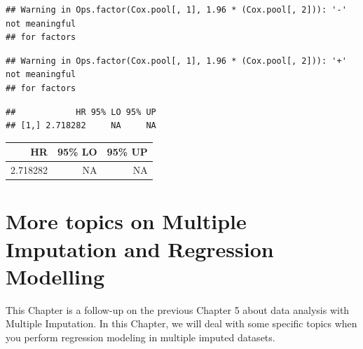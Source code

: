 \documentclass[
]{book}
\newenvironment{Shaded}{\begin{snugshade}}{\end{snugshade}}
\newcommand{\DataTypeTok}[1]{\textcolor[rgb]{0.13,0.29,0.53}{#1}}
\newcommand{\KeywordTok}[1]{\textcolor[rgb]{0.13,0.29,0.53}{\textbf{#1}}}
\newcommand{\NormalTok}[1]{#1}
\newcommand{\OperatorTok}[1]{\textcolor[rgb]{0.81,0.36,0.00}{\textbf{#1}}}
\newcommand{\StringTok}[1]{\textcolor[rgb]{0.31,0.60,0.02}{#1}}
\begin{document}
\begin{verbatim}
## Warning in Ops.factor(Cox.pool[, 1], 1.96 * (Cox.pool[, 2])): '-' not meaningful
## for factors
\end{verbatim}

\begin{verbatim}
## Warning in Ops.factor(Cox.pool[, 1], 1.96 * (Cox.pool[, 2])): '+' not meaningful
## for factors
\end{verbatim}

\begin{Shaded}
\end{Shaded}

\begin{verbatim}
##            HR 95% LO 95% UP
## [1,] 2.718282     NA     NA
\end{verbatim}

\begin{Shaded}
\end{Shaded}

\begin{tabular}{r|r|r}
\hline
HR & 95\% LO & 95\% UP\\
\hline
2.718282 & NA & NA\\
\hline
\end{tabular}

\hypertarget{more-topics-on-multiple-imputation-and-regression-modelling}{%
\chapter{More topics on Multiple Imputation and Regression Modelling}\label{more-topics-on-multiple-imputation-and-regression-modelling}}

This Chapter is a follow-up on the previous Chapter 5 about data analysis with Multiple Imputation. In this Chapter, we will deal with some specific topics when you perform regression modeling in multiple imputed datasets.
\end{document}

